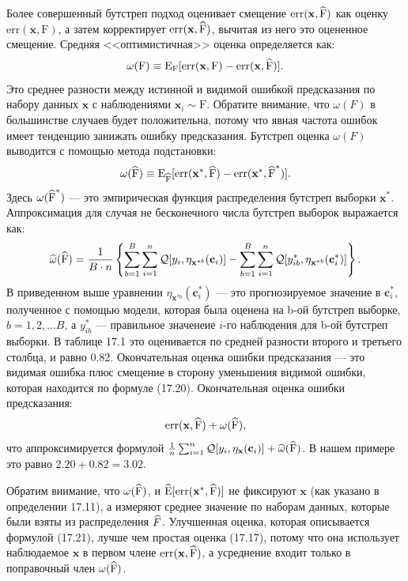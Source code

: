 Более совершенный бутстреп подход оценивает смещение $ \text{err}(\textbf{x}, \widehat{\text{F}})$ как оценку $ \text{err}(\textbf{x}, \text{F})$, а затем корректирует $ \text{err}(\textbf{x}, \widehat{\text{F}})$, вычитая из него это оцененное смещение. Средняя <<оптимистичная>> оценка определяется как:
\begin{equation}
\omega(\text{F}) \equiv \mathrm{E}_{\text{F}}[\text{err}(\textbf{x}, \text{F}) - \text{err}(\textbf{x}, \widehat{\text{F}})].
\end{equation}
Это среднее разности между истинной и видимой ошибкой предсказания по набору данных $\textbf{x}$ с наблюдениями $\textbf{x}_{i} \sim \text{F}$. Обратите внимание, что $\omega(F)$ в большинстве случаев будет положительна, потому что явная частота ошибок имеет тенденцию занижать ошибку предсказания. Бутстреп оценка $\omega(F)$ выводится с помощью метода подстановки:
\begin{equation}
\omega(\widehat{\text{F}}) \equiv \mathrm{E}_{\widehat{\text{F}}}[\text{err}(\textbf{x}^{*}, \widehat{\text{F}}) - \text{err}(\textbf{x}^{*}, \widehat{\text{F}}^{*})].
\end{equation}
Здесь $\omega(\widehat{\text{F}}^{*})$ --- это эмпирическая  функция распределения бутстреп выборки $\textbf{x}^{*}$. Аппроксимация для случая не бесконечного числа бутстреп выборок выражается как:
\begin{equation}
\widehat{\omega}(\widehat{\text{F}}) = \frac{1}{B\cdot n}\left \{ \sum_{b = 1}^{B} \sum_{i = 1}^{n} \mathcal{Q}[y_{i},  \eta_{\textbf{x}^{*b}}(\textbf{c}_{i})] - \sum_{b = 1}^{B} \sum_{i = 1}^{n} \mathcal{Q}[y^{*}_{ib},  \eta_{\textbf{x}^{*b}}(\textbf{c}^{*}_{i})] \right \}.
\end{equation}
В приведенном выше уравнении $\eta_{\textbf{x}^{*b}}(\textbf{c}^{*}_{i})$ --- это прогнозируемое значение в $\textbf{c}^{*}_{i}$, полученное с помощью модели, которая была оценена на b-ой бутстреп выборке, $b = 1, 2, ... B$, а $y^{*}_{ib}$ --- правильное значенеие $i$-го наблюдения для b-ой бутстреп выборки. В таблице 17.1 это оценивается по средней разности второго и третьего столбца, и равно $0.82$. Окончательная оценка ошибки предсказания --- это видимая ошибка плюс смещение в сторону уменьшения видимой ошибки, которая находится по формуле (17.20). Окончательная оценка ошибки предсказания:
\begin{equation}
\text{err}(\textbf{x}, \widehat{\text{F}}) + \omega(\widehat{\text{F}}),
\end{equation}
что аппроксимируется формулой $ \frac{1}{n} \sum_{i = 1}^{n} \mathcal{Q}[y_{i}, \eta_{\textbf{x}}(\textbf{c}_{i})] + \widehat{\omega}(\widehat{\text{F}})$. В нашем примере это равно $2.20 + 0.82 = 3.02$.

Обратим внимание, что $\omega(\widehat{\text{F}})$, и $\widehat{\mathrm{E}}[\text{err}(\textbf{x}^{*}, \widehat{\text{F}})]$ не фиксируют $\textbf{x}$ (как указано в определении 17.11), а измеряют среднее значение по наборам данных, которые были взяты из распределения $\widehat{F}$. Улучшенная оценка, которая описывается формулой (17.21), лучше чем простая оценка (17.17), потому что она использует наблюдаемое $\textbf{x}$ в первом члене $\text{err}(\textbf{x}, \widehat{\text{F}})$, а усреднение входит только в поправочный член $\omega(\widehat{\text{F}})$.